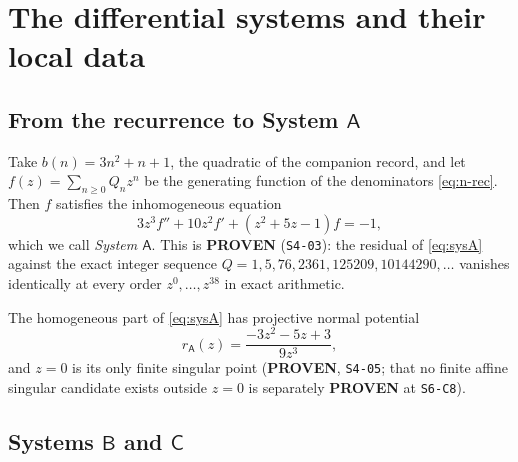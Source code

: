 %

\section{The differential systems and their local data}\label{sec:systems}

\subsection{From the recurrence to System \texorpdfstring{$\mathsf A$}{A}}
\label{ssec:sysA}

Take $b(n)=3n^2+n+1$, the quadratic of the companion record, and let
$f(z)=\sum_{n\ge0}Q_nz^n$ be the generating function of the denominators
\eqref{eq:n-rec}. Then $f$ satisfies the inhomogeneous equation
\begin{equation}\label{eq:sysA}
  3z^3f''+10z^2f'+(z^2+5z-1)f=-1 ,
\end{equation}
which we call \emph{System $\mathsf A$}. This is \textbf{PROVEN}
(\texttt{S4-03}): the residual of \eqref{eq:sysA} against the exact integer
sequence $Q=1,5,76,2361,125209,10144290,\dots$ vanishes identically at every
order $z^0,\dots,z^{38}$ in exact arithmetic.

The homogeneous part of \eqref{eq:sysA} has projective normal potential
\begin{equation}\label{eq:rA}
  r_{\mathsf A}(z)=\frac{-3z^2-5z+3}{9z^3},
\end{equation}
and $z=0$ is its only finite singular point (\textbf{PROVEN}, \texttt{S4-05};
that no finite affine singular candidate exists outside $z=0$ is separately
\textbf{PROVEN} at \texttt{S6-C8}).

\subsection{Systems \texorpdfstring{$\mathsf B$}{B} and
\texorpdfstring{$\mathsf C$}{C}}\label{ssec:sysBC}


